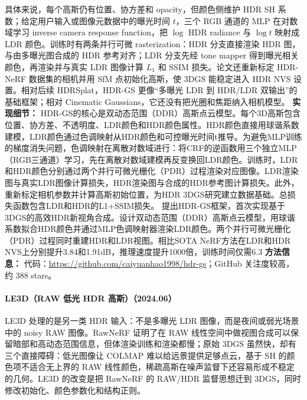 具体来说，每个高斯仍有位置、协方差和 opacity，但颜色侧维护 HDR SH 系数；给定用户输入或图像元数据中的曝光时间 $t$，三个 RGB 通道的 MLP 在对数域学习 inverse camera response function，把 $\log$ HDR radiance 与 $\log t$ 映射成 LDR 颜色。训练时有两条并行可微 rasterization：HDR 分支直接渲染 HDR 图，与由多曝光图合成的 HDR 参考对齐；LDR 分支先经 tone mapper 得到曝光相关颜色，再渲染并与真实 LDR 图像计算 $L_1$ 和 SSIM 损失。论文还重新标定 HDR-NeRF 数据集的相机并用 SfM 点初始化高斯，使 3DGS 能稳定进入 HDR NVS 设置。相对后续 HDRSplat，HDR-GS 更像“多曝光 LDR 到 HDR/LDR 双输出”的基础框架；相对 Cinematic Gaussians，它还没有把光圈和焦距纳入相机模型。
\textbf{实现细节：} HDR-GS的核心是双动态范围（DDR）高斯点云模型。每个3D高斯包含位置、协方差、不透明度、LDR颜色和HDR颜色属性。HDR颜色直接用球谐系数建模，LDR颜色通过色调映射从HDR颜色和可控曝光时间t推导。为避免MLP训练的梯度消失问题，色调映射在离散对数域进行：将CRF的逆函数用三个独立MLP（RGB三通道）学习，先在离散对数域建模再反变换回LDR颜色。训练时，LDR和HDR颜色分别通过两个并行可微光栅化（PDR）过程渲染对应图像。LDR渲染图与真实LDR图像计算损失，HDR渲染图与合成的HDR参考图计算损失。此外，重新标定相机参数并计算高斯初始位置，为HDR 3DGS研究建立数据基础。总损失函数包含LDR和HDR的L1+SSIM损失。 提出HDR-GS框架，首次实现基于3DGS的高效HDR新视角合成。设计双动态范围（DDR）高斯点云模型，用球谐系数拟合HDR颜色并通过MLP色调映射器渲染LDR颜色。两个并行可微光栅化（PDR）过程同时重建HDR和LDR视图。相比SOTA NeRF方法在LDR和HDR NVS上分别提升3.84和1.91dB，推理速度提升1000倍，训练时间仅需6.3
\textbf{方法信息：} 代码：\url{https://github.com/caiyuanhao1998/hdr-gs}；GitHub 关注度较高，约 388 stars。



\paragraph{LE3D（RAW 低光 HDR 高斯）（2024.06）\cite{2406_06216}}
LE3D 处理的是另一类 HDR 输入：不是多曝光 LDR 图像，而是夜间或弱光场景中的 noisy RAW 图像。RawNeRF 证明了在 RAW 线性空间中做视图合成可以保留暗部和高动态范围信息，但体渲染训练和渲染都慢；原始 3DGS 虽然快，却有三个直接障碍：低光图像让 COLMAP 难以给远景提供足够点云，基于 SH 的颜色项不适合无上界的 RAW 线性颜色，稀疏高斯在噪声监督下还容易形成不稳定的几何。LE3D 的改变是把 RawNeRF 的 RAW/HDR 监督思想迁到 3DGS，同时修改初始化、颜色参数化和结构正则。

